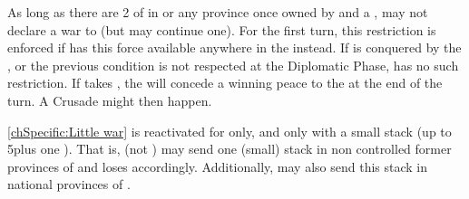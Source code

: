 \begin{digressions}


  \aparag As long as there are 2 \ARMY\faceplus of \HAB in \villeVienne or any
  province once owned by \paysHongrie and a \LeaderG, \TUR may not declare a
  war to \HAB (but may continue one). For the first turn, this restriction is
  enforced if \HAB has this force available anywhere in the \HRE instead.
  \aparag If \villeVienne is conquered by the \alliance, or the previous
  condition is not respected at the Diplomatic Phase, \TUR has no such
  restriction.
  \aparag If \TUR takes \villeVienne, the \ligue will concede a winning peace
  to the \alliance at the end of the turn. A Crusade might then happen.

  \aparag[] [BLP] \ref{chSpecific:Little war} is reactivated for \TUR only,
  and only with a small stack (up to 5\LD plus one \Pasha).
  \bparag That is, \TUR (not \paysCrimee) may send one (small) stack in non
  controlled former provinces of \paysHongrie and loses \STAB accordingly.
  \bparag Additionally, \TUR may also send this stack in national provinces of
  \AUS.



\end{digressions}
